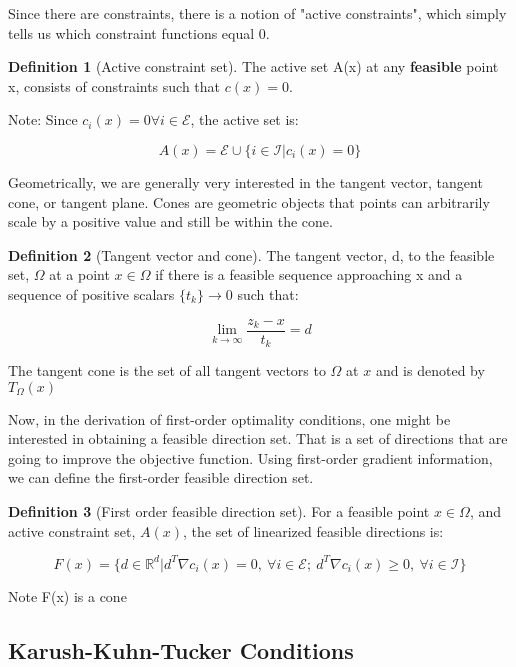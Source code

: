 \documentclass[class=article, crop=false]{standalone}
\theoremstyle{definition}
\newtheorem{definition}{Definition}[section]
\theoremstyle{remark}
\theoremstyle{lemma}
\theoremstyle{theorem}
\theoremstyle{corollary}
\theoremstyle{property}
\begin{document}
		Since there are constraints, there is a notion of "active constraints", which simply tells us which constraint functions equal 0.

		\begin{definition}[Active constraint set]
			The active set A(x) at any \textbf{feasible} point x, consists of 
			constraints such that $c(x) = 0$. 

			Note: Since $c_i(x) = 0 \forall i \in \mathcal{E}$, the active set is:

			$$A(x) = \mathcal{E} \cup \{i \in \mathcal{I} | c_i(x) = 0\}$$
		\end{definition}

		Geometrically, we are generally very interested in the tangent vector, tangent cone, or tangent plane. Cones are geometric objects that points can arbitrarily scale by a positive value and still be within the cone.

		\begin{definition}[Tangent vector and cone]
			The tangent vector, d, to the feasible set, $\Omega$ at a point $x \in \Omega$ if there is a feasible sequence approaching x and a sequence of positive scalars $\{t_k\} \rightarrow 0$ such that:

				$$\lim_{k \rightarrow \infty} \frac{z_k - x}{t_k} = d$$

			The tangent cone is the set of all tangent vectors to $\Omega$ at $x$ and is denoted by $T_\Omega(x)$
		\end{definition}

		Now, in the derivation of first-order optimality conditions, one might be interested in obtaining a feasible direction set. That is a set of directions that are going to improve the objective function. Using first-order gradient information, we can define the first-order feasible direction set.

		\begin{definition}[First order feasible direction set]
			For a feasible point $x \in \Omega$, and active constraint set, $A(x)$, the set of linearized feasible directions is:

				$$F(x) = \{ d \in \mathbb{R}^d | d^T \nabla c_i(x) = 0, \ \forall i \in \mathcal{E};\ d^T \nabla c_i(x) \ge 0,\ \forall i \in \mathcal{I}\}$$

			Note F(x) is a cone
		\end{definition}

	\subsection{Karush-Kuhn-Tucker Conditions}
\end{document}
